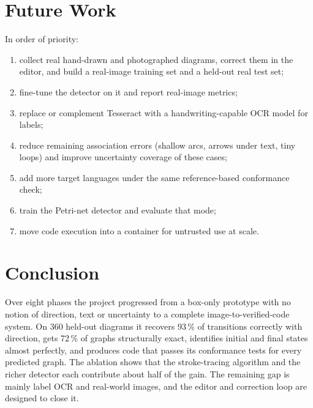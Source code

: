 \documentclass[journal,10pt]{IEEEtran}
\begin{document}
\section{Future Work}
In order of priority:
\begin{enumerate}
\item collect real hand-drawn and photographed diagrams, correct them in the editor, and
build a real-image training set and a held-out real test set;
\item fine-tune the detector on it and report real-image metrics;
\item replace or complement Tesseract with a handwriting-capable OCR model for labels;
\item reduce remaining association errors (shallow arcs, arrows under text, tiny loops)
and improve uncertainty coverage of these cases;
\item add more target languages under the same reference-based conformance check;
\item train the Petri-net detector and evaluate that mode;
\item move code execution into a container for untrusted use at scale.
\end{enumerate}

\section{Conclusion}
Over eight phases the project progressed from a box-only prototype with no notion of
direction, text or uncertainty to a complete image-to-verified-code system. On 360
held-out diagrams it recovers 93\,\% of transitions correctly with direction, gets 72\,\%
of graphs structurally exact, identifies initial and final states almost perfectly, and
produces code that passes its conformance tests for every predicted graph. The ablation
shows that the stroke-tracing algorithm and the richer detector each contribute about
half of the gain. The remaining gap is mainly label OCR and real-world images, and the
editor and correction loop are designed to close it.

\appendices
\end{document}
